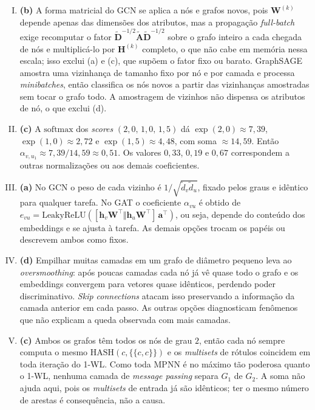 \documentclass{dlproblemset}
\begin{document}
\begin{enumerate}[I)]
    \item \textbf{(b)} A forma matricial do GCN se aplica a nós e grafos novos, pois $\mathbf{W}^{(k)}$ depende apenas das dimensões dos atributos, mas a propagação \textit{full-batch} exige recomputar o fator $\tilde{\mathbf{D}}^{-1/2} \tilde{\mathbf{A}} \tilde{\mathbf{D}}^{-1/2}$ sobre o grafo inteiro a cada chegada de nós e multiplicá-lo por $\mathbf{H}^{(k)}$ completo, o que não cabe em memória nessa escala; isso exclui (a) e (c), que supõem o fator fixo ou barato. GraphSAGE amostra uma vizinhança de tamanho fixo por nó e por camada e processa \textit{minibatches}, então classifica os nós novos a partir das vizinhanças amostradas sem tocar o grafo todo. A amostragem de vizinhos não dispensa os atributos de nó, o que exclui (d).

    \item \textbf{(c)} A $\mathrm{softmax}$ dos \textit{scores} $(2{,}0,\, 1{,}0,\, 1{,}5)$ dá $\exp(2{,}0) \approx 7{,}39$, $\exp(1{,}0) \approx 2{,}72$ e $\exp(1{,}5) \approx 4{,}48$, com soma $\approx 14{,}59$. Então $\alpha_{v,u_1} \approx 7{,}39/14{,}59 \approx 0{,}51$. Os valores $0{,}33$, $0{,}19$ e $0{,}67$ correspondem a outras normalizações ou aos demais coeficientes.

    \item \textbf{(a)} No GCN o peso de cada vizinho é $1/\sqrt{\tilde d_v \tilde d_u}$, fixado pelos graus e idêntico para qualquer tarefa. No GAT o coeficiente $\alpha_{vu}$ é obtido de $e_{vu} = \mathrm{LeakyReLU}([\mathbf{h}_v \mathbf{W}^{\top} \Vert \mathbf{h}_u \mathbf{W}^{\top}]\, \mathbf{a}^{\top})$, ou seja, depende do conteúdo dos embeddings e se ajusta à tarefa. As demais opções trocam os papéis ou descrevem ambos como fixos.

    \item \textbf{(d)} Empilhar muitas camadas em um grafo de diâmetro pequeno leva ao \textit{oversmoothing}: após poucas camadas cada nó já vê quase todo o grafo e os embeddings convergem para vetores quase idênticos, perdendo poder discriminativo. \textit{Skip connections} atacam isso preservando a informação da camada anterior em cada passo. As outras opções diagnosticam fenômenos que não explicam a queda observada com mais camadas.

    \item \textbf{(c)} Ambos os grafos têm todos os nós de grau $2$, então cada nó sempre computa o mesmo $\mathrm{HASH}(c, \{\!\!\{c, c\}\!\!\})$ e os \textit{multisets} de rótulos coincidem em toda iteração do 1-WL. Como toda MPNN é no máximo tão poderosa quanto o 1-WL, nenhuma camada de \textit{message passing} separa $G_1$ de $G_2$. A soma não ajuda aqui, pois os \textit{multisets} de entrada já são idênticos; ter o mesmo número de arestas é consequência, não a causa.
\end{enumerate}
\end{document}
